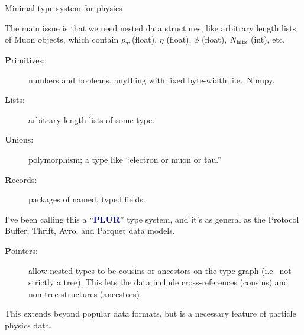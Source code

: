 \documentclass[aspectratio=169]{beamer}
\begin{document}
\begin{frame}{Minimal type system for physics}
\vspace{0.5 cm}

The main issue is that we need nested data structures, like arbitrary length lists of Muon objects, which contain $p_T$ (float), $\eta$ (float), $\phi$ (float), $N_{\mbox{\scriptsize hits}}$ (int), etc.

\large
\begin{description}
\item[{\bf P}rimitives:] numbers and booleans, anything with fixed byte-width; i.e.\ Numpy.

\item[{\bf L}ists:] arbitrary length lists of some type.

\item[{\bf U}nions:] polymorphism; a type like ``electron or muon or tau.''

\item[{\bf R}ecords:] packages of named, typed fields.
\end{description}

\normalsize I've been calling this a ``\textcolor{darkblue}{\bf PLUR}'' type system, and it's as general as the Protocol Buffer, Thrift, Avro, and Parquet data models.

\large
\begin{description}
\item[{\bf P}ointers:] allow nested types to be cousins or ancestors on the type graph (i.e.\ not strictly a tree). This lets the data include cross-references (cousins) and non-tree structures (ancestors).
\end{description}

\normalsize This extends beyond popular data formats, but is a necessary feature of particle physics data.
\end{frame}
\end{document}
